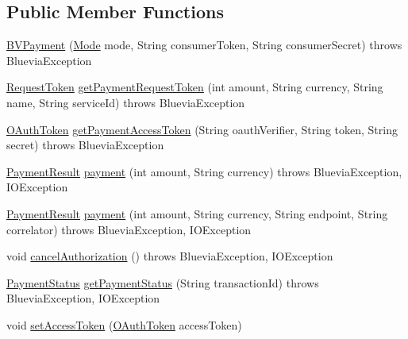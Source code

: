 \subsection*{Public Member Functions}
\begin{DoxyCompactItemize}
\item 
\hyperlink{classcom_1_1bluevia_1_1payment_1_1client_1_1BVPayment_a5a68583aad1f3173b22441b5e3b976b4}{BVPayment} (\hyperlink{classcom_1_1bluevia_1_1commons_1_1client_1_1BVBaseClient_a5f4a4a27d73a8ddd0ce450a6c7a4d1b7}{Mode} mode, String consumerToken, String consumerSecret)  throws BlueviaException 
\item 
\hyperlink{classcom_1_1bluevia_1_1commons_1_1connector_1_1http_1_1oauth_1_1RequestToken}{RequestToken} \hyperlink{classcom_1_1bluevia_1_1payment_1_1client_1_1BVPayment_a461ecfef018815ed3436c16c68852ec7}{getPaymentRequestToken} (int amount, String currency, String name, String serviceId)  throws BlueviaException 
\item 
\hyperlink{classcom_1_1bluevia_1_1commons_1_1connector_1_1http_1_1oauth_1_1OAuthToken}{OAuthToken} \hyperlink{classcom_1_1bluevia_1_1payment_1_1client_1_1BVPayment_a40a262c6f375755dcb52f9bd2831ed98}{getPaymentAccessToken} (String oauthVerifier, String token, String secret)  throws BlueviaException 
\item 
\hyperlink{classcom_1_1bluevia_1_1payment_1_1data_1_1PaymentResult}{PaymentResult} \hyperlink{classcom_1_1bluevia_1_1payment_1_1client_1_1BVPayment_abfca5647bbeffcb9b48b32917dfd41f3}{payment} (int amount, String currency)  throws BlueviaException, IOException 
\item 
\hyperlink{classcom_1_1bluevia_1_1payment_1_1data_1_1PaymentResult}{PaymentResult} \hyperlink{classcom_1_1bluevia_1_1payment_1_1client_1_1BVPayment_ae5e9baccc8f7a9a4a441b701e456a092}{payment} (int amount, String currency, String endpoint, String correlator)  throws BlueviaException, IOException 
\item 
void \hyperlink{classcom_1_1bluevia_1_1payment_1_1client_1_1BVPayment_a246785149105de4acdb6903491dbc623}{cancelAuthorization} ()  throws BlueviaException, IOException 
\item 
\hyperlink{classcom_1_1bluevia_1_1payment_1_1data_1_1PaymentStatus}{PaymentStatus} \hyperlink{classcom_1_1bluevia_1_1payment_1_1client_1_1BVPayment_a7938eb7923f88c81622f95ec64ad8a78}{getPaymentStatus} (String transactionId)  throws BlueviaException, IOException
\item 
void \hyperlink{classcom_1_1bluevia_1_1payment_1_1client_1_1BVPayment_a6e9d873055043c197ff745f468efe8f5}{setAccessToken} (\hyperlink{classcom_1_1bluevia_1_1commons_1_1connector_1_1http_1_1oauth_1_1OAuthToken}{OAuthToken} accessToken)
\end{DoxyCompactItemize}

